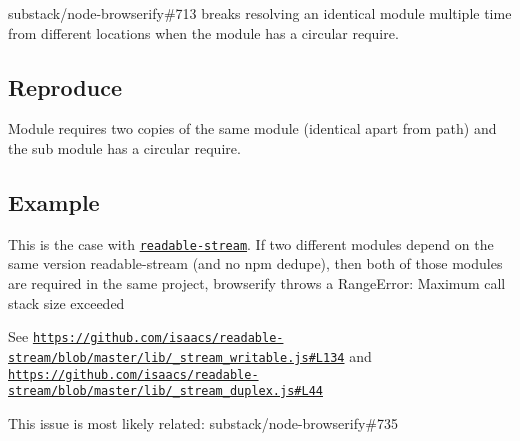 substack/node-\/browserify\#713 breaks resolving an identical module multiple time from different locations when the module has a circular require.

\subsection*{Reproduce}

Module requires two copies of the same module (identical apart from path) and the sub module has a circular require.

\subsection*{Example}

This is the case with \href{https://github.com/isaacs/readable-stream}{\tt readable-\/stream}. If two different modules depend on the same version readable-\/stream (and no npm dedupe), then both of those modules are required in the same project, browserify throws a {\ttfamily Range\+Error\+: Maximum call stack size exceeded}

See \href{https://github.com/isaacs/readable-stream/blob/master/lib/_stream_writable.js#L134}{\tt https\+://github.\+com/isaacs/readable-\/stream/blob/master/lib/\+\_\+stream\+\_\+writable.\+js\#\+L134} and \href{https://github.com/isaacs/readable-stream/blob/master/lib/_stream_duplex.js#L44}{\tt https\+://github.\+com/isaacs/readable-\/stream/blob/master/lib/\+\_\+stream\+\_\+duplex.\+js\#\+L44}

This issue is most likely related\+: substack/node-\/browserify\#735 